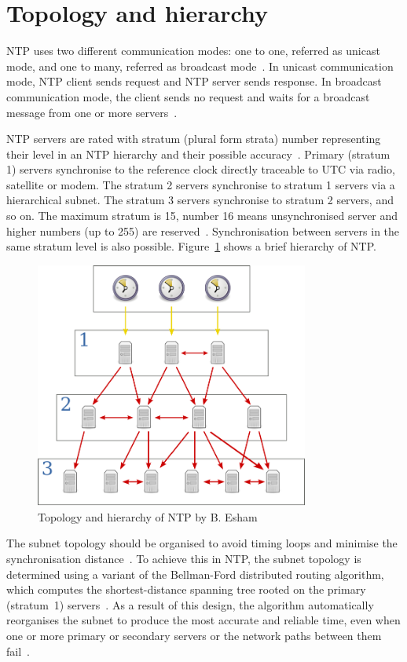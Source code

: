 
\section{Topology and hierarchy}\label{sec:ntp-topology}
NTP uses two different communication modes:
one to one, referred as unicast mode, and one to many, referred as broadcast mode~\cite{rfc5905}.
In unicast communication mode, NTP client sends request and NTP server sends response.
In broadcast communication mode, the client sends no request
and waits for a broadcast message from one or more servers~\cite{rfc5905}.

NTP servers are rated with stratum (plural form strata) number representing their level
in an NTP hierarchy and their possible accuracy~\cite{rfc5905}.
Primary (stratum 1) servers synchronise to the reference clock directly traceable to UTC via
radio, satellite or modem.
The stratum 2 servers synchronise to stratum 1
servers via a hierarchical subnet.
The stratum 3 servers synchronise to stratum 2 servers, and so on.
The maximum stratum is 15, number 16 means unsynchronised server
and higher numbers (up to 255) are reserved~\cite{rfc5905}.
Synchronisation between servers in the same stratum level is also possible.
Figure~\ref{fig:ntp-hierarchy} shows a brief hierarchy of NTP.
\begin{figure}
  \centering
  \includegraphics[width=9cm,keepaspectratio]{fig/Network_Time_Protocol_servers_and_clients.pdf}
  \caption{Topology and hierarchy of NTP by B. Esham}
  \label{fig:ntp-hierarchy}
  \bigskip
\end{figure}
The subnet topology should be organised to avoid timing loops
and minimise the synchronisation distance~\cite{rfc5905}.
To achieve this in NTP, the subnet topology is determined using a variant
of the Bellman-Ford distributed routing algorithm, which computes
the shortest-distance spanning tree rooted on the primary (stratum~1) servers~\cite{rfc5905}.
As a result of this design, the
algorithm automatically reorganises the subnet to produce the most accurate and reliable time,
even when one or more primary or secondary servers or the network paths between them fail~\cite{rfc5905}.
